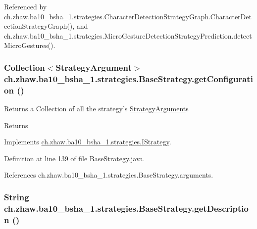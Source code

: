 Referenced by ch.zhaw.ba10\_\-bsha\_\-1.strategies.CharacterDetectionStrategyGraph.CharacterDetectionStrategyGraph(), and ch.zhaw.ba10\_\-bsha\_\-1.strategies.MicroGestureDetectionStrategyPrediction.detectMicroGestures().\hypertarget{classch_1_1zhaw_1_1ba10__bsha__1_1_1strategies_1_1BaseStrategy_a38329740106081e084162fb2e2c25f07}{
\subsubsection[{getConfiguration}]{\setlength{\rightskip}{0pt plus 5cm}Collection$<${\bf StrategyArgument}$>$ ch.zhaw.ba10\_\-bsha\_\-1.strategies.BaseStrategy.getConfiguration ()}}
\label{classch_1_1zhaw_1_1ba10__bsha__1_1_1strategies_1_1BaseStrategy_a38329740106081e084162fb2e2c25f07}
Returns a Collection of all the strategy's \hyperlink{classch_1_1zhaw_1_1ba10__bsha__1_1_1StrategyArgument}{StrategyArgument}s

\begin{DoxyReturn}{Returns}

\end{DoxyReturn}


Implements \hyperlink{interfacech_1_1zhaw_1_1ba10__bsha__1_1_1strategies_1_1IStrategy_aa03517aa764bf207ef9fccc86102ca85}{ch.zhaw.ba10\_\-bsha\_\-1.strategies.IStrategy}.

Definition at line 139 of file BaseStrategy.java.

References ch.zhaw.ba10\_\-bsha\_\-1.strategies.BaseStrategy.arguments.\hypertarget{classch_1_1zhaw_1_1ba10__bsha__1_1_1strategies_1_1BaseStrategy_a56e779e4ce93ac1570b34bcde23e7455}{
\subsubsection[{getDescription}]{\setlength{\rightskip}{0pt plus 5cm}String ch.zhaw.ba10\_\-bsha\_\-1.strategies.BaseStrategy.getDescription ()}}
\label{classch_1_1zhaw_1_1ba10__bsha__1_1_1strategies_1_1BaseStrategy_a56e779e4ce93ac1570b34bcde23e7455}


